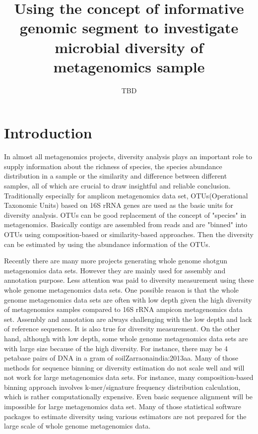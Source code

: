 \documentclass{article}
\begin{document}
\title{Using the concept of informative genomic segment to investigate 
microbial diversity of metagenomics sample}
\author{TBD}
\maketitle
\tableofcontents
\begin{abstract}
\end{abstract}

\section{Introduction}

In almost all  metagenomics projects, diversity analysis plays an important
role to supply information about the richness of species, the species abundance
distribution in a sample or the similarity and difference between different 
samples, all of which are crucial to draw insightful and reliable conclusion. 
Traditionally especially for amplicon metagenomics data set, OTUs(Operational 
Taxonomic Units) based on 16S rRNA genes are used as the basic units for 
diversity analysis. OTUs can be good replacement of the concept of "species" in 
metagenomics. Basically contigs are assembled from reads and are "binned" into
OTUs using composition-based or similarity-based approaches. Then the diversity
can be estimated by using the abundance information of the OTUs.

Recently there are many more projects generating whole genome shotgun metagenomics data sets. However they are 
mainly used for assembly and annotation purpose. Less attention was paid to diversity measurement
using these whole genome metagenomics data sets. One possible reason is that the whole genome metagenomics
data sets are often with low depth given the high diversity of metagenomics samples compared to 16S rRNA
ampicon metagenomics data set. Assembly and annotation are always challenging with the low depth and lack of 
reference sequences. It is also true for diversity measurement. On the other hand, although with low depth, some whole genome metagenomics 
data sets are with large size because of the high diversity. For instance, there may be 4 petabase
pairs of DNA in a gram of soil{Zarraonaindia:2013aa}. Many of those methods for sequence binning or diversity 
estimation do not scale well and will not work for large metagenomics data sets. For instance,
many composition-based binning approach involves k-mer/signature frequency distribution calculation, which is 
rather computationally expensive. Even basic sequence alignment will be impossible for large metagenomics data set.
Many of those statistical software packages to estimate diversity using various estimators are not prepared 
for the large scale of whole genome metagenomics data. 
\end{document}
